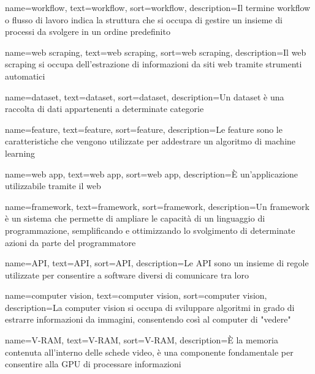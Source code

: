  {
    name=workflow,
    text=workflow,
    sort=workflow,
    description={Il termine workflow o flusso di lavoro indica la struttura che si occupa di gestire un insieme di processi da svolgere in un ordine predefinito}
}

 {
    name=web scraping,
    text=web scraping,
    sort=web scraping,
    description={Il web scraping si occupa dell'estrazione di informazioni da siti web tramite strumenti automatici}
}

 {
    name=dataset,
    text=dataset,
    sort=dataset,
    description={Un dataset è una raccolta di dati appartenenti a determinate categorie}
}

 {
    name=feature,
    text=feature,
    sort=feature,
    description={Le feature sono le caratteristiche che vengono utilizzate per addestrare un algoritmo di machine learning}
}

 {
    name=web app,
    text=web app,
    sort=web app,
    description={È un'applicazione utilizzabile tramite il web}
}

 {
    name=framework,
    text=framework,
    sort=framework,
    description={Un framework è un sistema che permette di ampliare le capacità di un linguaggio di programmazione, semplificando e ottimizzando lo svolgimento di determinate azioni da parte del programmatore}
}

 {
    name=API,
    text=API,
    sort=API,
    description={Le API sono un insieme di regole utilizzate per consentire a software diversi di comunicare tra loro}
}

 {
    name=computer vision,
    text=computer vision,
    sort=computer vision,
    description={La computer vision si occupa di sviluppare algoritmi in grado di estrarre informazioni da immagini, consentendo così al computer di "vedere"}
}

 {
    name=V-RAM,
    text=V-RAM,
    sort=V-RAM,
    description={È la memoria contenuta all'interno delle schede video, è una componente fondamentale per consentire alla GPU di processare informazioni}
}

